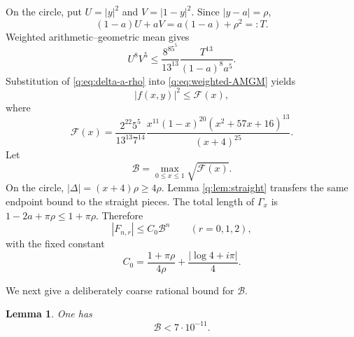\documentclass[11pt]{amsart}
\theoremstyle{plain}
\newtheorem{lemma}[theorem]{Lemma}
\theoremstyle{remark}\newtheorem{remark}[theorem]{Remark}
\numberwithin{equation}{section}
\begin{document}
On the circle, put $U=|y|^2$ and $V=|1-y|^2$.  Since $|y-a|=\rho$,
\begin{equation}\label{q:eq:UVidentity}
 (1-a)U+aV=a(1-a)+\rho^2=:T.
\end{equation}
Weighted arithmetic--geometric mean gives
\begin{equation}\label{q:eq:weighted-AMGM}
 U^8V^5
 \le \frac{8^85^5}{13^{13}}\frac{T^{13}}{(1-a)^8a^5}.
\end{equation}
Substitution of \eqref{q:eq:delta-a-rho} into \eqref{q:eq:weighted-AMGM} yields
\begin{equation}\label{q:eq:Fcal}
 |f(x,y)|^2\le\mathcal F(x),
\end{equation}
where
\begin{equation}\label{q:eq:Fcal-explicit}
 \boxed{
 \mathcal F(x)=
 \frac{2^{22}5^5}{13^{13}7^{14}}
 \frac{x^{11}(1-x)^{20}(x^2+57x+16)^{13}}{(x+4)^{25}}.}
\end{equation}
Let
\begin{equation}\label{q:eq:Bdef}
 \mathcal B=\max_{0\le x\le1}\sqrt{\mathcal F(x)}.
\end{equation}
On the circle, $|\Delta|=(x+4)\rho\ge4\rho$.  Lemma
\ref{q:lem:straight} transfers the same endpoint bound to the straight pieces.
The total length of $\Gamma_x$ is $1-2a+\pi\rho\le1+\pi\rho$.  Therefore
\begin{equation}\label{q:eq:Fbound}
 |F_{n,r}|\le C_0\mathcal B^n\qquad(r=0,1,2),
\end{equation}
with the fixed constant
\begin{equation}\label{q:eq:C0}
 C_0=\frac{1+\pi\rho}{4\rho}
     +\frac{|\log4+i\pi|}{4}.
\end{equation}

We next give a deliberately coarse rational bound for $\mathcal B$.

\begin{lemma}\label{q:lem:B-rational}
One has
\begin{equation}\label{q:eq:Bsimple}
  \mathcal B<7\cdot10^{-11}.
\end{equation}
\end{lemma}
\end{document}
